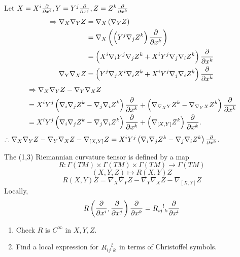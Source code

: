   Let \(X=X^i\pdv{x^i},Y=Y^j\pdv{x^j},Z=Z^k\pdv{x^k}\)
  \begin{align*}
    \Rightarrow \nabla_X\nabla_Y Z&=
    \nabla_X\left(\nabla_Y Z\right)\\
    &=\nabla_X\left(\left(Y^j \nabla_j Z^k\right)\pdv{x^k}\right)\\
    &=\left(X^i\nabla_i Y^j\nabla_j Z^k+X^i Y^j\nabla_j\nabla_i Z^k
    \right)\pdv{x^k}\\
    \nabla_Y\nabla_X Z&=\left(Y^j\nabla_j X^i \nabla_i Z^k
    +X^iY^j \nabla_j\nabla_i Z^k\right)\pdv{x^k}
  \end{align*}
  \begin{align*}
    &\Rightarrow \nabla_X\nabla_Y Z-\nabla_Y\nabla_X Z\\
    &=
    X^i Y^j\left(\nabla_i\nabla_j Z^k-\nabla_j\nabla_i Z^k\right)
    \pdv{x^k}+\left(\nabla_{\nabla_X Y}Z^k-\nabla_{\nabla
    _Y X }Z^k\right)\pdv{x^k}\\
    &=X^i Y^j\left(\nabla_i\nabla_j Z^k-\nabla_j\nabla_i Z^k\right)
    \pdv{x^k}
    +\left(\nabla_{[X,Y]}Z^k\right)\pdv{x^k}.
  \end{align*}
  \(\therefore \nabla_X\nabla_Y Z-\nabla_Y\nabla_X Z -\nabla_{[X,Y]}Z=
  X^i Y^j\left(\nabla_i\nabla_j Z^k-\nabla_j\nabla_i Z^k\right)
    \pdv{x^k}
  \).
\begin{definition}
    The (1,3) Riemannian curvature tensor is defined by a map 
    \[
        R\colon \Gamma(TM)\times \Gamma(TM)\times \Gamma(TM)
        \to \Gamma(TM)    
    \]
    \[
        \left(X,Y,Z\right)\mapsto R(X,Y)Z    
    \]
    \[
        R(X,Y)Z=\nabla_X\nabla_Y Z-\nabla_Y\nabla_X Z -\nabla_{[X,Y]}Z    
    \]
    Locally, 
    \[
        R\left(\pdv{x^i},\pdv{x^j}\right)\pdv{x^k}=R\indices{_{ij}^l_k}
        \pdv{x^l}    
    \]
\end{definition}
\begin{exercise}
    \begin{enumerate}[(1)]
        \item Check \(R\) is \(C^\infty\) in \(X,Y,Z\).
        \item Find a local expression for \(R\indices{_{ij}^l_k}\)
        in terms of Christoffel symbols.
    \end{enumerate}
\end{exercise}